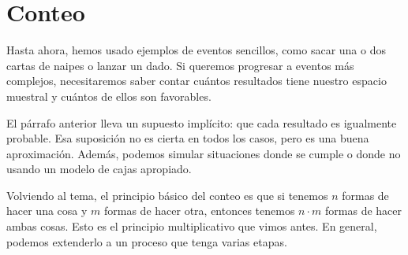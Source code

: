 \begin{figure}[ht]
\centering
{}
\end{figure}

\section{Conteo}

Hasta ahora, hemos usado ejemplos de eventos sencillos, como sacar una o dos cartas de naipes o lanzar un dado. Si queremos progresar a eventos más complejos, necesitaremos saber contar cuántos resultados tiene nuestro espacio muestral y cuántos de ellos son favorables.

El párrafo anterior lleva un supuesto implícito: que cada resultado es igualmente probable. Esa suposición no es cierta en todos los casos, pero es una buena aproximación. Además, podemos simular situaciones donde se cumple o donde no usando un modelo de cajas apropiado.

Volviendo al tema, el principio básico del conteo es que si tenemos \(n\) formas de hacer una cosa y \(m\) formas de hacer otra, entonces tenemos \(n \cdot m\) formas de hacer ambas cosas. Esto es el principio multiplicativo que vimos antes. En general, podemos extenderlo a un proceso que tenga varias etapas.

